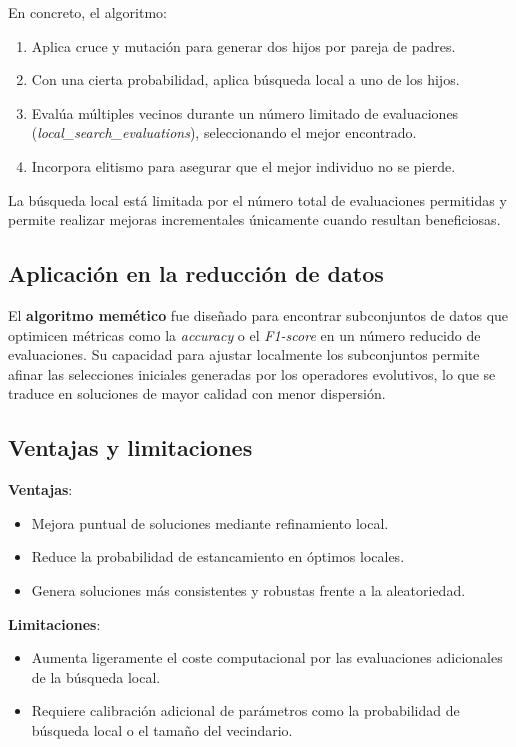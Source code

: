 En concreto, el algoritmo:
\begin{enumerate}
      \item Aplica cruce y mutación para generar dos hijos por pareja de padres.
      \item Con una cierta probabilidad, aplica búsqueda local a uno de los hijos.
      \item Evalúa múltiples vecinos durante un número limitado de evaluaciones (\textit{local\_search\_evaluations}), seleccionando el mejor encontrado.
      \item Incorpora elitismo para asegurar que el mejor individuo no se pierde.
\end{enumerate}


La búsqueda local está limitada por el número total de evaluaciones permitidas y permite realizar mejoras incrementales únicamente cuando resultan beneficiosas.


\subsection{Aplicación en la reducción de datos}\label{subsec:aplicacion-en-la-reduccion-de-datos4}
El \textbf{algoritmo memético} fue diseñado para encontrar subconjuntos de datos que optimicen métricas
como la \textit{accuracy} o el \textit{F1-score} en un número reducido de evaluaciones.
Su capacidad para ajustar localmente los subconjuntos permite afinar las selecciones iniciales generadas
por los operadores evolutivos, lo que se traduce en soluciones de mayor calidad con menor dispersión.

\subsection{Ventajas y limitaciones}\label{subsec:ventajas-y-limitaciones3}
\textbf{Ventajas}:
\begin{itemize}
      \item Mejora puntual de soluciones mediante refinamiento local.
      \item Reduce la probabilidad de estancamiento en óptimos locales.
      \item Genera soluciones más consistentes y robustas frente a la aleatoriedad.
\end{itemize}

\textbf{Limitaciones}:
\begin{itemize}
      \item Aumenta ligeramente el coste computacional por las evaluaciones adicionales de la búsqueda local.
      \item Requiere calibración adicional de parámetros como la probabilidad de búsqueda local o el tamaño del vecindario.
\end{itemize}
